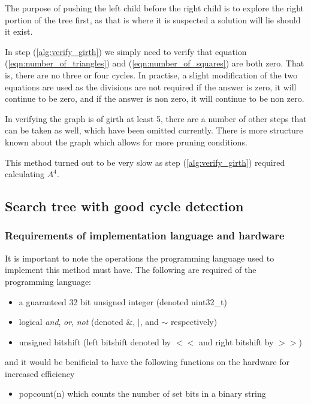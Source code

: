 \documentclass[a4paper]{article}
\begin{document}
The purpose of pushing the left child before the right child is to explore the right portion of the tree first, as that is where it is suspected a solution will lie should it exist.

In step (\ref{alg:verify_girth}) we simply need to verify that equation (\ref{eqn:number_of_triangles}) and (\ref{eqn:number_of_squares}) are both zero. That is, there are no three or four cycles. In practise, a slight modification of the two equations are used as the divisions are not required if the answer is zero, it will continue to be zero, and if the answer is non zero, it will continue to be non zero.

In verifying the graph is of girth at least 5, there are a number of other steps that can be taken as well, which have been omitted currently. There is more structure known about the graph which allows for more pruning conditions.

This method turned out to be very slow as step (\ref{alg:verify_girth}) required calculating $A^4$.

\subsection{Search tree with good cycle detection}
\subsubsection{Requirements of implementation language and hardware}
\label{sec:requirements}
It is important to note the operations the programming language used to implement this method must have. The following are required of the programming language:
\begin{itemize}
\item a guaranteed 32 bit unsigned integer (denoted uint32\_t)
\item logical \emph{and}, \emph{or}, \emph{not} (denoted \&, $\mid$, and $\sim$ respectively)
\item unsigned bitshift (left bitshift denoted by $<<$ and right bitshift by $>>$)
\end{itemize}
and it would be benificial to have the following functions on the hardware for increased efficiency
\begin{itemize}
\item popcount(n) which counts the number of set bits in a binary string
\end{itemize}
\end{document}
